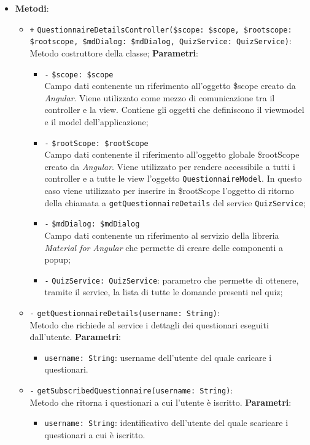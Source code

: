 \begin{itemize}
\begin{itemize}
	\end{itemize}
	\item \textbf{Metodi}:
	\begin{itemize}
		\item \texttt{+} \texttt{QuestionnaireDetailsController(\$scope: \$scope, \$rootscope: \$rootscope, \$mdDialog: \$mdDialog, QuizService: QuizService)}: \\ Metodo costruttore della classe;
		\textbf{Parametri}: 
		\begin{itemize}
			\item \texttt{-} \texttt{\$scope: \$scope} \\
			Campo dati contenente un riferimento all’oggetto \$scope creato da \textit{Angular}. Viene utilizzato come mezzo di comunicazione tra il controller e la view. Contiene gli oggetti che definiscono il viewmodel e il model dell’applicazione;
			\item \texttt{-} \texttt{\$rootScope: \$rootScope} \\
			Campo dati contenente il riferimento all'oggetto globale \$rootScope creato da \textit{Angular}. Viene utilizzato per rendere accessibile a tutti i controller e a tutte le view l'oggetto \texttt{QuestionnaireModel}. In questo caso viene utilizzato per inserire in \$rootScope l'oggetto di ritorno della chiamata a \texttt{getQuestionnaireDetails} del service \texttt{QuizService};	
			\item \texttt{-} \texttt{\$mdDialog: \$mdDialog} \\
			Campo dati contenente un riferimento al servizio della libreria \textit{Material for Angular} che permette di creare delle componenti a popup;
			\item \texttt{-} \texttt{QuizService: QuizService}: parametro che permette di ottenere, tramite il service, la lista di tutte le domande presenti nel quiz;
		\end{itemize}
		
		\item \texttt{-} \texttt{getQuestionnaireDetails(username: String)}: \\ Metodo che richiede al service i dettagli dei questionari eseguiti dall'utente.
		\textbf{Parametri}:
		\begin{itemize}
			\item \texttt{username: String}: username dell'utente del quale caricare i questionari.
		\end{itemize}
		\item \texttt{-} \texttt{getSubscribedQuestionnaire(username: String)}: \\Metodo che ritorna i questionari a cui l'utente è iscritto.
		\textbf{Parametri}:
		\begin{itemize}
			\item \texttt{username: String}: identificativo dell'utente del quale scaricare i questionari a cui è iscritto.
		\end{itemize}
	\end{itemize}
\end{itemize}

